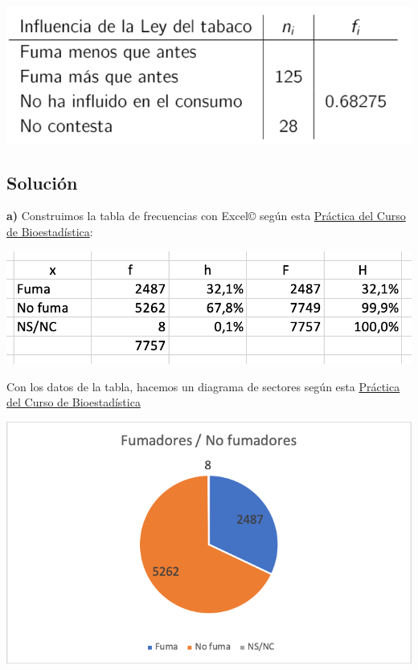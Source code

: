 \documentclass[
]{book}
\begin{document}
\includegraphics[width=10.58in]{img/1_01}

\hypertarget{soluciuxf3n}{%
\subsection{Solución}\label{soluciuxf3n}}

\textbf{a)} Construimos la tabla de frecuencias con Excel© según esta \href{https://1fjmanzano.github.io/bioestadistica/tablas-de-frecuencias.html\#tabla-de-frecuencias-pr\%C3\%A1ctica-con-excel}{Práctica del Curso de Bioestadística}:

\includegraphics[width=13.06in]{img/1_02}

Con los datos de la tabla, hacemos un diagrama de sectores según esta \href{https://1fjmanzano.github.io/bioestadistica/diagramas-de-barras-y-sectores.html\#diagramas-de-barras-y-sectores-pr\%C3\%A1ctica-con-excel}{Práctica del Curso de Bioestadística}

\includegraphics[width=10.03in]{img/1_03}
\end{document}
